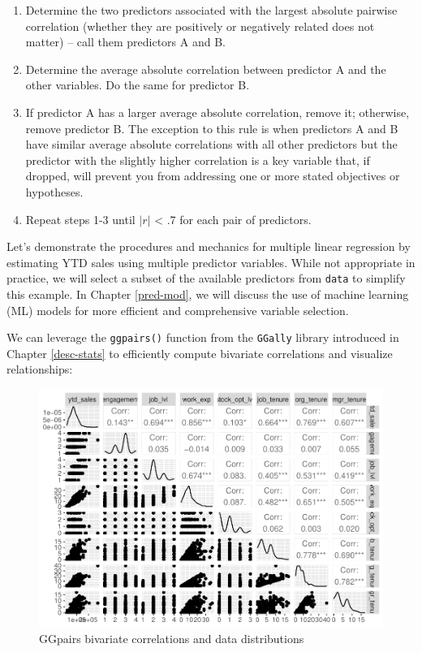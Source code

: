 \documentclass[
]{book}
\providecommand{\tightlist}{%
  \setlength{\itemsep}{0pt}\setlength{\parskip}{0pt}}
\begin{document}
\begin{enumerate}
\def\labelenumi{\arabic{enumi}.}
\tightlist
\item
  Determine the two predictors associated with the largest absolute pairwise correlation (whether they are positively or negatively related does not matter) -- call them predictors A and B.
\item
  Determine the average absolute correlation between predictor A and the other variables. Do the same for predictor B.
\item
  If predictor A has a larger average absolute correlation, remove it; otherwise, remove predictor B. The exception to this rule is when predictors A and B have similar average absolute correlations with all other predictors but the predictor with the slightly higher correlation is a key variable that, if dropped, will prevent you from addressing one or more stated objectives or hypotheses.
\item
  Repeat steps 1-3 until \(|r|\) \textless{} .7 for each pair of predictors.
\end{enumerate}

Let's demonstrate the procedures and mechanics for multiple linear regression by estimating YTD sales using multiple predictor variables. While not appropriate in practice, we will select a subset of the available predictors from \texttt{data} to simplify this example. In Chapter \ref{pred-mod}, we will discuss the use of machine learning (ML) models for more efficient and comprehensive variable selection.

We can leverage the \texttt{ggpairs()} function from the \texttt{GGally} library introduced in Chapter \ref{desc-stats} to efficiently compute bivariate correlations and visualize relationships:

\begin{figure}

{\centering \includegraphics[width=1\linewidth]{The_Fundamentals_of_People_Analytics_files/figure-latex/ggpairs-ytd-sales-1} 

}

\caption{GGpairs bivariate correlations and data distributions}\label{fig:ggpairs-ytd-sales}
\end{figure}
\end{document}
